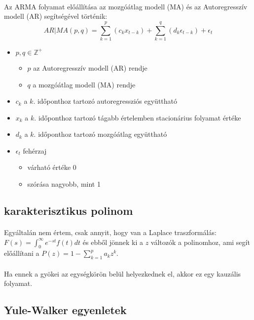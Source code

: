 \documentclass[11pt,a4pape,draftr]{article}
\begin{document}
					\paragraph{}
						Az ARMA folyamat előállítása az mozgóátlag modell (MA) és az Autoregresszív modell (AR) segítségével történik:
						$$AR|MA(p,q) = \sum_{k = 1}^p (c_k x_{t-k}) + \sum_{k=1}^q(d_k \epsilon_{t-k}) + \epsilon_t$$
						\begin{itemize}
							\item $p,q \in \mathbb{Z}^+$
							\begin{itemize}
								\item $p$ az Autoregresszív modell (AR) rendje
								\item $q$ a mozgóátlag modell (MA) rendje
							\end{itemize}
							\item $c_k$ a $k.$ időponthoz tartozó autoregressziós együttható
							\item $x_k$ a $k.$ időponthoz tartozó tágabb értelemben stacionárius folyamat értéke
							\item $d_k$ a $k.$ időponthoz tartozó mozgóátlag együttható
							\item $\epsilon_t$ fehérzaj
							\begin{itemize}
								\item várható értéke 0
								\item szórása nagyobb, mint 1
							\end{itemize}
						\end{itemize}
				\subsection{karakterisztikus polinom}
					\paragraph{}
						Egyáltalán nem értem, csak annyit, hogy van a Laplace traszformálás: $F(s) = \int_0^\infty e^{-st}f(t)dt$ és ebből jönnek ki a $z$ változók a polinomhoz, ami segít előállítani a $P(z) = 1-\sum_{k=1}^{p} a_k z^k$. 
					\paragraph{}
						Ha ennek a gyökei az egységkörön belül helyezkednek el, akkor ez egy kauzális folyamat.
				\subsection{Yule-Walker egyenletek}
\end{document}
